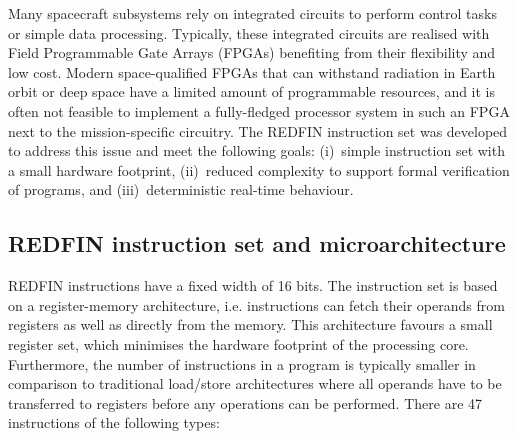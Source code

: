 
Many spacecraft subsystems rely on integrated circuits to perform control tasks
or simple data processing. Typically, these integrated circuits are realised
with Field Programmable Gate Arrays (FPGAs) benefiting from their flexibility
and low cost. Modern space-qualified FPGAs that can withstand radiation in Earth
orbit or deep space have a limited amount of programmable resources, and it is
often not feasible to implement a fully-fledged processor system in such an FPGA
next to the mission-specific circuitry.
The REDFIN instruction set was developed to address this issue and meet the
following goals: (i)~simple instruction set with a small hardware footprint,
(ii)~reduced complexity to support formal verification of programs, and
(iii)~deterministic real-time behaviour.

\subsection{REDFIN instruction set and microarchitecture}
\vspace{-0.5mm}

REDFIN instructions have a fixed width of 16 bits.
The instruction set is based on a register-memory architecture, i.e.
instructions can fetch their operands from registers as well as directly from the
memory. This architecture favours a small register set, which minimises the hardware
footprint of the processing core. Furthermore, the number of instructions in a
program is typically smaller in comparison to traditional load/store architectures
where all operands have to be transferred to registers before any operations can
be performed. There are 47 instructions of the following types:

